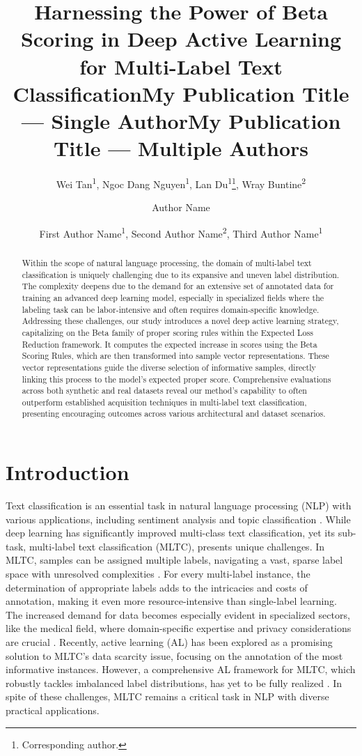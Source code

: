 \documentclass[letterpaper]{article} %
\title{Harnessing the Power of Beta Scoring in Deep Active Learning for Multi-Label Text Classification}
\author{
Wei Tan\textsuperscript{\rm 1},
Ngoc Dang Nguyen\textsuperscript{\rm 1},
Lan Du\textsuperscript{\rm 1}\thanks{Corresponding author.},
Wray Buntine\textsuperscript{\rm 2}
}
\title{My Publication Title --- Single Author}
\author {
Author Name
}
\title{My Publication Title --- Multiple Authors}
\author {
First Author Name\textsuperscript{\rm 1},
Second Author Name\textsuperscript{\rm 2},
Third Author Name\textsuperscript{\rm 1}
}
\begin{document}
\maketitle

\begin{abstract}

Within the scope of natural language processing, the domain of multi-label text classification is uniquely challenging due to its expansive and uneven label distribution. The complexity deepens due to the demand for an extensive set of annotated data for training an advanced deep learning model, especially in specialized fields where the labeling task can be labor-intensive and often requires domain-specific knowledge. Addressing these challenges, our study introduces a novel deep active learning strategy, capitalizing on the Beta family of proper scoring rules within the Expected Loss Reduction framework. It computes the expected increase in scores using the Beta Scoring Rules,  which are then transformed into sample vector representations. These vector representations guide the diverse selection of informative samples, directly linking this process to the model's expected proper score.
Comprehensive evaluations across both synthetic and real datasets reveal our method's capability to often outperform established acquisition techniques in multi-label text classification, presenting encouraging outcomes across various architectural and dataset scenarios.

\end{abstract}

\section{Introduction}
\label{sec:Intro}

Text classification is an essential task in natural language processing (NLP) with various applications, including sentiment analysis and topic classification \cite{8719904, 9412588}.
While deep learning has significantly improved multi-class text classification, yet its sub-task, multi-label text classification (MLTC), presents unique challenges.
In MLTC, samples can be assigned multiple labels, navigating a vast, sparse label space with unresolved complexities \citep{10.1145/3077136.3080834, 8830456}.
For every multi-label instance, the determination of appropriate labels adds to the intricacies and costs of annotation, making it even more resource-intensive than single-label learning.
The increased demand for data becomes especially evident in specialized sectors, like the medical field, where domain-specific expertise and privacy considerations are crucial \citep{BUSTOS2020101797}.
Recently, active learning (AL) has been explored as a promising solution to MLTC's data scarcity issue, focusing on the annotation of the most informative instances.
However, a comprehensive AL framework for MLTC, which robustly tackles imbalanced label distributions, has yet to be fully realized \citep{Cherman2019, 10.1145/3379504}.
In spite of these challenges, MLTC remains a critical task in NLP with diverse practical applications.
\end{document}
